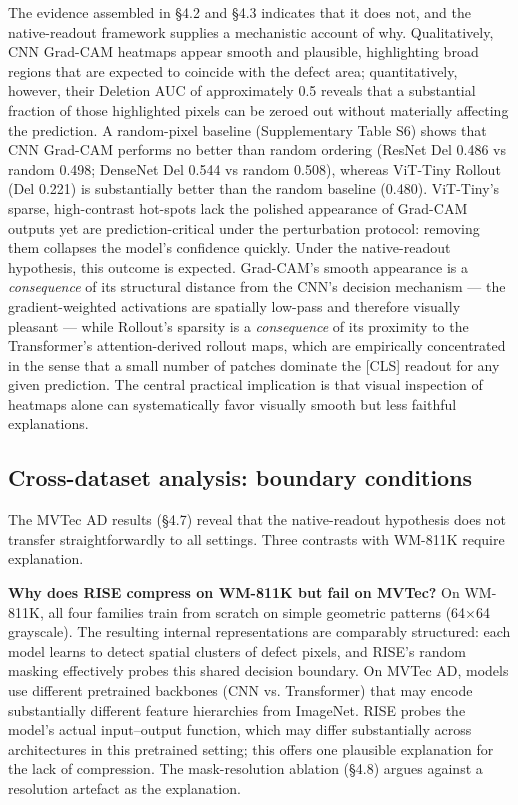 \documentclass[11pt,a4paper]{article}
\begin{document}
The evidence assembled in \S{}4.2 and \S{}4.3 indicates that it does not, and the native-readout framework supplies a mechanistic account of why. Qualitatively, CNN Grad-CAM heatmaps appear smooth and plausible, highlighting broad regions that are expected to coincide with the defect area; quantitatively, however, their Deletion AUC of approximately 0.5 reveals that a substantial fraction of those highlighted pixels can be zeroed out without materially affecting the prediction. A random-pixel baseline (Supplementary Table S6) shows that CNN Grad-CAM performs no better than random ordering (ResNet Del 0.486 vs random 0.498; DenseNet Del 0.544 vs random 0.508), whereas ViT-Tiny Rollout (Del 0.221) is substantially better than the random baseline (0.480). ViT-Tiny's sparse, high-contrast hot-spots lack the polished appearance of Grad-CAM outputs yet are prediction-critical under the
perturbation protocol: removing them collapses the model's confidence quickly. Under the native-readout hypothesis, this outcome is expected. Grad-CAM's smooth appearance is a \emph{consequence} of its structural distance from the CNN's decision mechanism --- the gradient-weighted activations are spatially low-pass and therefore visually pleasant --- while Rollout's sparsity is a \emph{consequence} of its proximity to the Transformer's attention-derived rollout maps, which are empirically concentrated in the sense that a small number of patches dominate the [CLS] readout for any given prediction. The central practical implication is that visual inspection of heatmaps alone can systematically favor visually smooth but less faithful explanations.

\subsection{Cross-dataset analysis: boundary conditions}

The MVTec AD results (\S{}4.7) reveal that the native-readout hypothesis does not transfer straightforwardly to all settings. Three contrasts with WM-811K require explanation.

\textbf{Why does RISE compress on WM-811K but fail on MVTec?} On WM-811K, all four families train from scratch on simple geometric patterns (64$\times$64 grayscale). The resulting internal representations are comparably structured: each model learns to detect spatial clusters of defect pixels, and RISE's random masking effectively probes this shared decision boundary. On MVTec AD, models use different pretrained backbones (CNN vs. Transformer) that may encode substantially different feature hierarchies from ImageNet. RISE probes the model's actual input--output function, which may differ substantially across architectures in this pretrained setting; this offers one plausible explanation for the lack of compression. The mask-resolution ablation (\S{}4.8) argues against a resolution artefact as the explanation.
\end{document}

